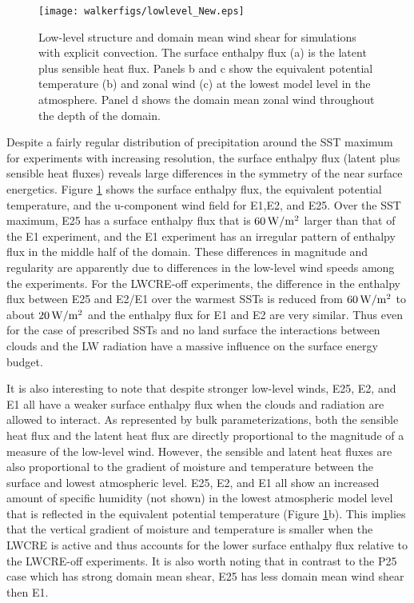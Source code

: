 \documentclass[draft]{agujournal2019}
\begin{document}
{\begin{figure}
  \centering       
    \texttt{[image: walkerfigs/lowlevel\_New.eps]}
    \caption{Low-level structure and domain mean wind shear for simulations with explicit convection.  
    The surface enthalpy flux (a) is the latent plus sensible heat flux.  Panels b and c show 
    the equivalent potential temperature (b) and zonal wind (c) at the lowest model level in the atmosphere.  Panel 
    d shows the domain mean zonal wind throughout the depth of the domain.}
    \label{fig:enthalpy}
\end{figure}

Despite a fairly regular distribution of precipitation around the SST maximum for experiments with increasing resolution, the 
surface enthalpy flux (latent plus sensible heat fluxes) reveals large differences in the symmetry of the near surface energetics.   
Figure \ref{fig:enthalpy} shows the surface enthalpy flux, 
the equivalent potential temperature, and the u-component wind field for E1,E2, and E25.  
Over the SST maximum, E25 has a surface enthalpy flux that is $60 \, \rm{W/m^2}$ 
larger than that of the E1 experiment, and the E1 experiment has an irregular pattern of enthalpy flux in the middle
half of the domain.  These differences in magnitude and regularity are apparently due to differences in the low-level 
wind speeds among the experiments.  For the LWCRE-off experiments, the difference in the enthalpy flux between E25 and E2/E1 
over the warmest SSTs is reduced from $60 \, \rm{W/m^2}$ to about $20 \, \rm{W/m^2}$ and the enthalpy
flux for E1 and  E2 are very similar.   Thus even for the case of prescribed SSTs and no
land surface the interactions between clouds and the LW radiation have a massive influence on the 
surface energy budget.


It is also interesting to note that despite stronger low-level winds, E25, E2, and E1 all have a weaker surface
enthalpy flux when the clouds and radiation are allowed to interact.   As represented 
by bulk parameterizations, both the sensible heat flux and the latent heat flux are directly proportional to the 
magnitude of a measure of the low-level wind.  However, the sensible and latent heat fluxes are also 
proportional to the gradient of moisture and temperature between the surface and lowest atmospheric level.    
E25, E2, and E1 all show an increased amount of specific humidity (not shown) in the lowest atmospheric 
model level that is reflected in the equivalent potential temperature (Figure \ref{fig:enthalpy}b).  This 
implies that the vertical gradient of moisture and temperature is smaller when the LWCRE is active and thus accounts 
for the lower surface enthalpy flux relative to the LWCRE-off experiments.         
It is also worth noting that in contrast to the P25 case which has strong domain mean shear, E25 has less domain 
mean wind shear then E1.  


}
\end{document}
